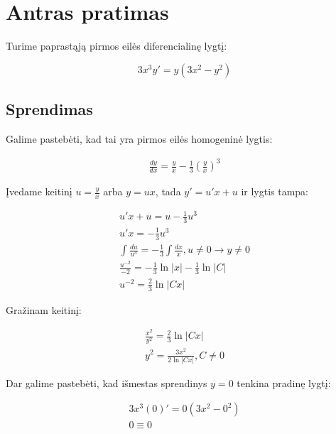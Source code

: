 \documentclass[11pt]{article}
\begin{document}
\newpage
\section{Antras pratimas}

Turime paprastąją pirmos eilės diferencialinę lygtį:

\begin{equation}
    3x^3y'=y(3x^2-y^2)
\end{equation}

\subsection{Sprendimas}

Galime pastebėti, kad tai yra pirmos eilės homogeninė lygtis:

\begin{equation}
\begin{split}
\frac{dy}{dx}=\frac{y}{x}-\frac{1}{3}\left(\frac{y}{x}\right)^3
\end{split}
\end{equation}

Įvedame keitinį $u=\frac{y}{x}$ arba $y=ux$, tada $y'=u'x+u$ ir lygtis tampa:

\begin{equation}
\begin{split}
u'x+u=u-\frac{1}{3}u^3\\
u'x=-\frac{1}{3}u^3\\
\int\frac{du}{u^3}=-\frac{1}{3}\int\frac{dx}{x}, u\ne 0\rightarrow y\ne 0\\
\frac{u^{-2}}{-2}=-\frac{1}{3}\ln|x|-\frac{1}{3}\ln|C|\\
u^{-2}=\frac{2}{3}\ln|Cx|
\end{split}
\end{equation}

Gražinam keitinį:

\begin{equation}
\begin{split}
\frac{x^2}{y^2}=\frac{2}{3}\ln|Cx|\\
y^2=\frac{3x^2}{2\ln|Cx|}, C \neq 0
\end{split}
\end{equation}

Dar galime pastebėti, kad išmestas sprendinys $y=0$ tenkina pradinę lygtį:

\begin{equation}
\begin{split}
3x^3(0)'=0(3x^2-0^2)\\
0\equiv 0
\end{split}
\end{equation}
\end{document}
